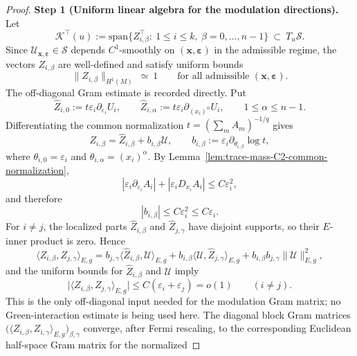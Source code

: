 \documentclass[11pt,reqno,a4paper]{amsart}
\numberwithin{equation}{section}
\theoremstyle{plain}
\theoremstyle{remark}
\theoremstyle{plain}
\begin{document}
\begin{proof}
\smallskip\noindent
\textbf{Step 1 (Uniform linear algebra for the modulation directions).}
Let
\[
\mathcal K^{\top}(u):=\mathrm{span}\{Z_{i,\beta}^{\top}:\ 1\le i\le k,\ \beta=0,\dots,n-1\}\ \subset\ T_u\mathcal S.
\]
Since $\mathcal U_{\mathbf x,\boldsymbol\varepsilon}\in\mathcal S$ depends $C^1$-smoothly on
$(\mathbf x,\boldsymbol\varepsilon)$ in the admissible regime, the vectors $Z_{i,\beta}$ are
well-defined and satisfy uniform bounds
\[
\|Z_{i,\beta}\|_{H^1(M)}\ \simeq\ 1
\qquad\text{for all admissible }(\mathbf x,\boldsymbol\varepsilon).
\]
The off-diagonal Gram estimate is recorded directly.  Put
\[
\widehat Z_{i,0}:=t\varepsilon_i\partial_{\varepsilon_i}U_i,
\qquad
\widehat Z_{i,\alpha}:=t\varepsilon_i\partial_{(x_i)^\alpha}U_i,
\qquad 1\le\alpha\le n-1.
\]
Differentiating the common normalization $t=(\sum_mA_m)^{-1/q}$ gives
\begin{equation}\label{eq:Z-decomposition-normalization}
Z_{i,\beta}=\widehat Z_{i,\beta}+b_{i,\beta}\mathcal U,
\qquad
b_{i,\beta}:=\varepsilon_i\partial_{\theta_{i,\beta}}\log t,
\end{equation}
where $\theta_{i,0}=\varepsilon_i$ and $\theta_{i,\alpha}=(x_i)^\alpha$.
By Lemma~\ref{lem:trace-mass-C2-common-normalization},
\[
|\varepsilon_i\partial_{\varepsilon_i}A_i|+|\varepsilon_iD_{x_i}A_i|
\le C\varepsilon_i^2,
\]
and therefore
\begin{equation}\label{eq:Z-normalization-coefficient-small}
|b_{i,\beta}|\le C\varepsilon_i^2\le C\varepsilon_i.
\end{equation}
For $i\ne j$, the localized parts $\widehat Z_{i,\beta}$ and $\widehat Z_{j,\gamma}$ have disjoint supports,
so their $E$-inner product is zero.  Hence
\[
\langle Z_{i,\beta},Z_{j,\gamma}\rangle_{E,g}
=b_{j,\gamma}\langle \widehat Z_{i,\beta},\mathcal U\rangle_{E,g}
+b_{i,\beta}\langle \mathcal U,\widehat Z_{j,\gamma}\rangle_{E,g}
+b_{i,\beta}b_{j,\gamma}\|\mathcal U\|_{E,g}^2,
\]
and the uniform bounds for $\widehat Z_{i,\beta}$ and $\mathcal U$ imply
\begin{equation}\label{eq:Z-cross}
\big|\langle Z_{i,\beta},Z_{j,\gamma}\rangle_{E,g}\big|
\le C(\varepsilon_i+\varepsilon_j)=o(1)
\qquad(i\ne j).
\end{equation}
This is the only off-diagonal input needed for the modulation Gram matrix; no Green-interaction estimate is
being used here.  The diagonal block Gram matrices
$\big(\langle Z_{i,\beta},Z_{i,\gamma}\rangle_{E,g}\big)_{\beta,\gamma}$
converge, after Fermi rescaling, to the corresponding Euclidean half-space Gram matrix for the normalized

\end{proof}
\end{document}
